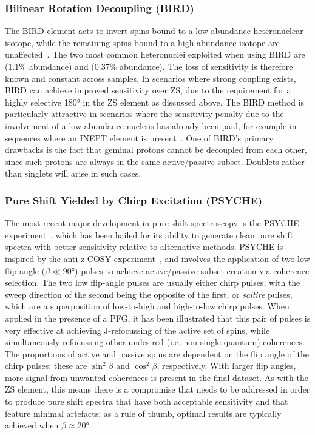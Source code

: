 \subsubsection{Bilinear Rotation Decoupling (BIRD)}
The \ac{BIRD} element acts to invert spins bound to a low-abundance
heteronuclear isotope, while the remaining spins bound to a high-abundance
isotope are unaffected~\cite{Garbow1982,Bax1983}.
The two most common heteronuclei exploited when using \ac{BIRD} are 
(1.1\% abundance) and  (0.37\% abundance). The loss of sensitivity
is therefore known and constant across samples. In scenarios where strong
coupling exists, \ac{BIRD} can achieve improved sensitivity over \ac{ZS}, due
to the requirement for a highly selective \ang{180} in the \ac{ZS} element as
discussed above.
The \ac{BIRD} method is particularly attractive in scenarios where the
sensitivity penalty due to the involvement of a low-abundance nucleus has
already been paid, for example in sequences where an \ac{INEPT} element is
present~\cite{Paudel2013}. One of \ac{BIRD}'s primary drawbacks is the fact that
geminal protons cannot be decoupled from each other, since such protons are
always in the same active/passive subset. Doublets rather than singlets will
arise in such cases.

\subsubsection{Pure Shift Yielded by Chirp Excitation (PSYCHE)}
\label{subsec:psyche}
The most recent major development in pure shift spectroscopy is the \ac{PSYCHE}
experiment~\cite{Foroozandeh2014,Foroozandeh2018}, which has been hailed for its
ability to generate clean pure shift spectra with better sensitivity relative to
alternative methods. \ac{PSYCHE} is inspired by
the anti z-\ac{COSY} experiment~\cite{Thrippleton2003}, and involves the application
of two low flip-angle ($\beta \ll \ang{90}$) pulses to achieve active/passive
subset creation via coherence selection. The two low flip-angle pulses
are usually either chirp pulses, with the sweep direction of the second being
the opposite of the first, or \emph{saltire} pulses, which are a superposition
of low-to-high and high-to-low chirp pulses. When applied in the presence of a
\ac{PFG}, it has been illustrated that this pair of pulses is very effective at
achieving J-refocussing of the active set of spins, while simultaneously
refocussing other undesired (i.e. non-single quantum) coherences.
The proportions of active and passive spins are dependent on the flip angle of
the chirp pulses; these are $\sin^2 \beta$ and $\cos^2 \beta$,
respectively. With larger flip angles, more signal from unwanted
coherences is present in the final dataset. As with the \ac{ZS} element, this
means there is a compromise that needs to be addressed in order to produce
pure shift spectra that have both acceptable sensitivity and that feature
minimal artefacts; as a rule of thumb, optimal results are typically achieved
when $\beta \approx \ang{20}$.

